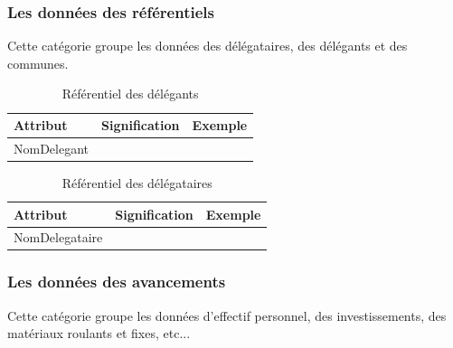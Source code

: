\documentclass[a4paper]{report}
\begin{document}
\begin{doublespace}
	\subsubsection{Les données des référentiels}

	Cette catégorie groupe les données des délégataires, des délégants et des communes.

	\begin{table}[H]
		\begin{center}
			\begin{tabularx}{17.5cm}{|X|p{3cm}|p{1.5cm}|}
				\hline
				\textbf{Attribut} & \textbf{Signification} & \textbf{Exemple} \\
				\hline
				NomDelegant       &                        &                  \\
				\hline
			\end{tabularx}
			\caption{Référentiel des délégants}
		\end{center}
	\end{table}

	\begin{table}[H]
		\begin{center}
			\begin{tabularx}{17.5cm}{|X|p{3cm}|p{1.5cm}|}
				\hline
				\textbf{Attribut} & \textbf{Signification} & \textbf{Exemple} \\
				\hline
				NomDelegataire    &                        &                  \\
				\hline
			\end{tabularx}
			\caption{Référentiel des délégataires}
		\end{center}
	\end{table}

	\subsubsection{Les données des avancements}

	Cette catégorie groupe les données d'effectif personnel, des investissements, des matériaux roulants et fixes, etc...



\end{doublespace}
\end{document}
